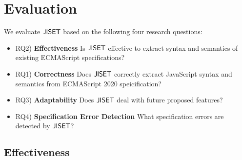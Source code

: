 \section{Evaluation}\label{sec:eval}

We evaluate \( \text{\sf JISET} \) based on the following four research questions:
\begin{itemize}
  \item RQ2) \textbf{Effectiveness} Is \( \text{\sf JISET} \) effective to extract syntax and
    semantics of existing ECMAScript specifications?
  \item RQ1) \textbf{Correctness} Does \( \text{\sf JISET} \) correctly extract JavaScript syntax
    and semantics from ECMAScript 2020 speicification?
  \item RQ3) \textbf{Adaptability} Does \( \text{\sf JISET} \) deal with future proposed features?
  \item RQ4) \textbf{Specification Error Detection} What specification errors
    are detected by \( \text{\sf JISET} \)?
\end{itemize}

\subsection{Effectiveness}

